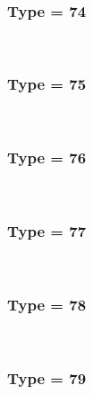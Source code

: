 \documentclass{article}
\begin{document}
            \\
        
        
        
            \subsubsection*{Type = 74}    
            
            \\
        
        
        
            \subsubsection*{Type = 75}    
            
            \\
        
        
        
            \subsubsection*{Type = 76}    
            
            \\
        
        
        
            \subsubsection*{Type = 77}    
            
            \\
        
        
        
            \subsubsection*{Type = 78}    
            
            \\
        
        
        
            \subsubsection*{Type = 79}    
            
            \\
        
\end{document}
